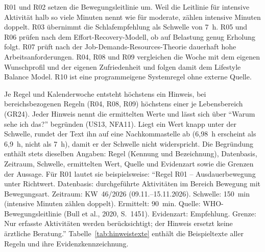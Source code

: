 R01 und R02 setzen die Bewegungsleitlinie um. Weil die Leitlinie für intensive Aktivität halb so viele Minuten nennt wie für moderate, zählen intensive Minuten doppelt. R03 übernimmt die Schlafempfehlung als Schwelle von 7~h. R05 und R06 prüfen nach dem Effort-Recovery-Modell, ob auf Belastung genug Erholung folgt. R07 prüft nach der Job-Demands-Resources-Theorie dauerhaft hohe Arbeitsanforderungen. R04, R08 und R09 vergleichen die Woche mit dem eigenen Wunschprofil und der eigenen Zufriedenheit und folgen damit dem Lifestyle Balance Model. R10 ist eine programmeigene Systemregel ohne externe Quelle.

Je Regel und Kalenderwoche entsteht höchstens ein Hinweis, bei bereichsbezogenen Regeln (R04, R08, R09) höchstens einer je Lebensbereich (GR24). Jeder Hinweis nennt die ermittelten Werte und lässt sich über \enquote{Warum sehe ich das?} begründen (US13, NFA11). Liegt ein Wert knapp unter der Schwelle, rundet der Text ihn auf eine Nachkommastelle ab (6,98~h erscheint als 6,9~h, nicht als 7~h), damit er der Schwelle nicht widerspricht. Die Begründung enthält stets dieselben Angaben: Regel (Kennung und Bezeichnung), Datenbasis, Zeitraum, Schwelle, ermittelten Wert, Quelle und Evidenzart sowie die Grenzen der Aussage. Für R01 lautet sie beispielsweise: \enquote{Regel R01 -- Ausdauerbewegung unter Richtwert. Datenbasis: durchgeführte Aktivitäten im Bereich Bewegung mit Bewegungsart. Zeitraum: \ac{KW}~46/2026 (09.11.--15.11.2026). Schwelle: 150~min (intensive Minuten zählen doppelt). Ermittelt: 90~min. Quelle: WHO-Bewegungsleitlinie (Bull et al., 2020, S.~1451). Evidenzart: Empfehlung. Grenze: Nur erfasste Aktivitäten werden berücksichtigt; der Hinweis ersetzt keine ärztliche Beratung.} Tabelle~\ref{tab:hinweistexte} enthält die Beispieltexte aller Regeln und ihre Evidenzkennzeichnung.

